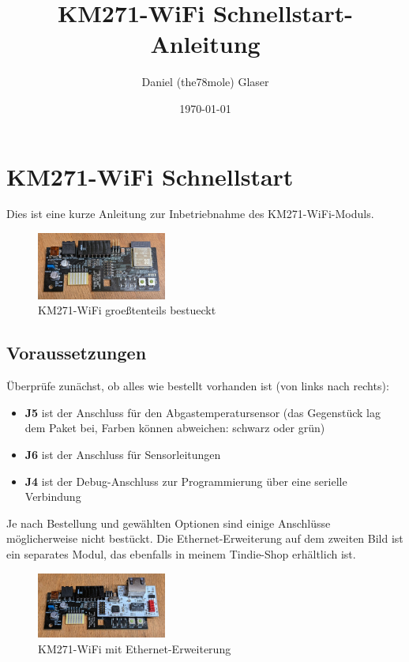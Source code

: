 \documentclass[
  9pt,
]{extarticle}
\title{KM271-WiFi Schnellstart-Anleitung}
\author{Daniel (the78mole) Glaser}
\date{\today}
\providecommand{\tightlist}{%
  \setlength{\itemsep}{0pt}\setlength{\parskip}{0pt}}
\begin{document}
\maketitle

\section{KM271-WiFi Schnellstart}\label{km271-wifi-schnellstart}

Dies ist eine kurze Anleitung zur Inbetriebnahme des KM271-WiFi-Moduls.

  \begin{figure}
    \centering
    \includegraphics[width=0.38\textwidth]{../IMG/KM271-WiFi-0.1.0.jpg}
    \caption{KM271-WiFi groeßtenteils bestueckt}
  \end{figure}
  

\subsection{Voraussetzungen}\label{voraussetzungen}

Überprüfe zunächst, ob alles wie bestellt vorhanden ist (von links nach
rechts):

\begin{itemize}
\tightlist
\item
  \textbf{J5} ist der Anschluss für den Abgastemperatursensor (das
  Gegenstück lag dem Paket bei, Farben können abweichen: schwarz oder
  grün)
\item
  \textbf{J6} ist der Anschluss für Sensorleitungen
\item
  \textbf{J4} ist der Debug-Anschluss zur Programmierung über eine
  serielle Verbindung
\end{itemize}

Je nach Bestellung und gewählten Optionen sind einige Anschlüsse
möglicherweise nicht bestückt. Die Ethernet-Erweiterung auf dem zweiten
Bild ist ein separates Modul, das ebenfalls in meinem Tindie-Shop
erhältlich ist.

  \begin{figure}
    \centering
    \includegraphics[width=0.38\textwidth]{../IMG/KM271-WiFi-0.1.0-ETH-Ext.jpg}
    \caption{KM271-WiFi mit Ethernet-Erweiterung}
  \end{figure}
  
\end{document}
